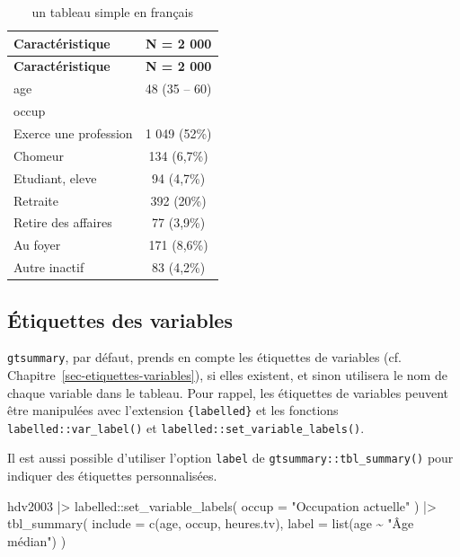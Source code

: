 \documentclass[
  letterpaper,
  DIV=11,
  numbers=noendperiod,
  oneside]{scrreprt}
\newenvironment{Shaded}{\begin{snugshade}}{\end{snugshade}}
\newcommand{\AttributeTok}[1]{\textcolor[rgb]{0.40,0.45,0.13}{#1}}
\newcommand{\FunctionTok}[1]{\textcolor[rgb]{0.28,0.35,0.67}{#1}}
\newcommand{\NormalTok}[1]{\textcolor[rgb]{0.00,0.23,0.31}{#1}}
\newcommand{\SpecialCharTok}[1]{\textcolor[rgb]{0.37,0.37,0.37}{#1}}
\newcommand{\StringTok}[1]{\textcolor[rgb]{0.13,0.47,0.30}{#1}}
\begin{document}
\hypertarget{tbl-tableau-simple-fr}{}
\begin{longtable}[]{@{}lc@{}}
\caption{\label{tbl-tableau-simple-fr}un tableau simple en
français}\tabularnewline
\toprule()
\textbf{Caractéristique} & \textbf{N = 2 000} \\
\midrule()
\endfirsthead
\toprule()
\textbf{Caractéristique} & \textbf{N = 2 000} \\
\midrule()
\endhead
age & 48 (35 -- 60) \\
occup & \\
Exerce une profession & 1 049 (52\%) \\
Chomeur & 134 (6,7\%) \\
Etudiant, eleve & 94 (4,7\%) \\
Retraite & 392 (20\%) \\
Retire des affaires & 77 (3,9\%) \\
Au foyer & 171 (8,6\%) \\
Autre inactif & 83 (4,2\%) \\
\bottomrule()
\end{longtable}

\hypertarget{uxe9tiquettes-des-variables}{%
\subsection{Étiquettes des
variables}\label{uxe9tiquettes-des-variables}}

\texttt{gtsummary}, par défaut, prends en compte les étiquettes de
variables (cf. Chapitre~\ref{sec-etiquettes-variables}), si elles
existent, et sinon utilisera le nom de chaque variable dans le tableau.
Pour rappel, les étiquettes de variables peuvent être manipulées avec
l'extension \texttt{\{labelled\}} et les fonctions
\texttt{labelled::var\_label()} et
\texttt{labelled::set\_variable\_labels()}.

Il est aussi possible d'utiliser l'option \texttt{label} de
\texttt{gtsummary::tbl\_summary()} pour indiquer des étiquettes
personnalisées.

\begin{Shaded}
\begin{Highlighting}[]
\NormalTok{hdv2003 }\SpecialCharTok{|\textgreater{}} 
\NormalTok{  labelled}\SpecialCharTok{::}\FunctionTok{set\_variable\_labels}\NormalTok{(}
    \AttributeTok{occup =} \StringTok{"Occupation actuelle"}
\NormalTok{  ) }\SpecialCharTok{|\textgreater{}} 
  \FunctionTok{tbl\_summary}\NormalTok{(}
    \AttributeTok{include =} \FunctionTok{c}\NormalTok{(age, occup, heures.tv),}
    \AttributeTok{label =} \FunctionTok{list}\NormalTok{(age }\SpecialCharTok{\textasciitilde{}} \StringTok{"Âge médian"}\NormalTok{)}
\NormalTok{  )}
\end{Highlighting}
\end{Shaded}
\end{document}
